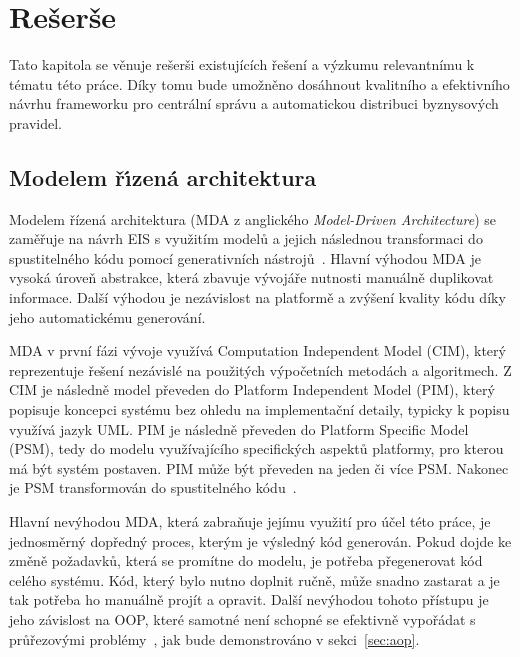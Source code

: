 
\chapter{Rešerše}\label{ch:reserse}

Tato kapitola se věnuje rešerši existujících řešení
a výzkumu relevantnímu k tématu této práce. Díky tomu bude umožněno
dosáhnout kvalitního a efektivního návrhu frameworku pro centrální správu a automatickou
distribuci byznysových pravidel.

\section{Modelem ř\'{\i}zená architektura}

Modelem řízená architektura (\gls{MDA} z anglického \textit{Model-Driven
Architecture}) se zaměřuje na návrh \gls{EIS} s využitím modelů a jejich
následnou transformaci do spustitelného kódu pomocí generativních nástrojů~\cite{soley2000model}.
Hlavní výhodou \gls{MDA} je vysoká úroveň abstrakce, která zbavuje vývojáře nutnosti
manuálně duplikovat informace. Další výhodou je nezávislost na platformě a zvýšení
kvality kódu díky jeho automatickému generování.

\gls{MDA} v první fázi vývoje využívá Computation Independent Model (\gls{CIM}), který reprezentuje
řešení nezávislé na použitých výpočetních metodách a algoritmech. Z \gls{CIM} je
následně model převeden do Platform Independent Model (\gls{PIM}),
který popisuje koncepci systému bez ohledu na implementační detaily, typicky k popisu
využívá jazyk \gls{UML}. \gls{PIM} je následně převeden do
Platform Specific Model (\gls{PSM}), tedy do modelu využívajícího
specifických aspektů platformy, pro kterou má být systém postaven.
\gls{PIM} může být převeden na jeden či více \gls{PSM}.
Nakonec je \gls{PSM} transformován do spustitelného kódu~\cite{kleppe2003model}.

Hlavní nevýhodou \gls{MDA}, která zabraňuje jejímu využití
pro účel této práce, je jednosměrný dopředný proces, kterým je výsledný kód generován.
Pokud dojde ke změně požadavků, která se promítne do modelu, je potřeba přegenerovat
kód celého systému. Kód, který bylo nutno doplnit ručně, může snadno zastarat a je tak
potřeba ho manuálně projít a opravit.
Další nevýhodou tohoto přístupu je jeho závislost na \gls{OOP},
které samotné není schopné se efektivně vypořádat s průřezovými
problémy~\cite{kennard2009separation}\cite{cemus2014aspect},
jak bude demonstrováno v sekci~\ref{sec:aop}.

